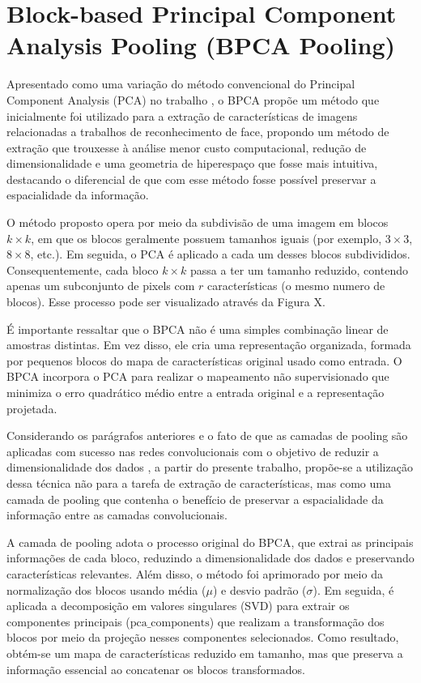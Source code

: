 \section{Block-based Principal Component Analysis Pooling (BPCA Pooling)}
\label{bpca}
Apresentado como uma variação do método convencional do Principal Component Analysis (PCA) no trabalho \cite{Salvadeo2011}, o BPCA propõe um método que inicialmente foi utilizado para a extração de características de imagens relacionadas a trabalhos de reconhecimento de face, propondo um método de extração que trouxesse à análise menor custo computacional, redução de dimensionalidade e uma geometria de hiperespaço que fosse mais intuitiva, destacando o diferencial de que com esse método fosse possível preservar a espacialidade da informação.

O método proposto opera por meio da subdivisão de uma imagem em blocos $k \times k$, em que os blocos geralmente possuem tamanhos iguais (por exemplo, $3 \times 3$, $8 \times 8$, etc.). Em seguida, o PCA é aplicado a cada um desses blocos subdivididos. Consequentemente, cada bloco $k \times k$ passa a ter um tamanho reduzido, contendo apenas um subconjunto de pixels com $r$ características (o mesmo numero de blocos). Esse processo pode ser visualizado através da Figura X.

É importante ressaltar que o BPCA não é uma simples combinação linear de amostras distintas. Em vez disso, ele cria uma representação organizada, formada por pequenos blocos do mapa de características original usado como entrada. O BPCA incorpora o PCA para realizar o mapeamento não supervisionado que minimiza o erro quadrático médio entre a entrada original e a representação projetada.

Considerando os parágrafos anteriores e o fato de que as camadas de pooling são aplicadas com sucesso nas redes convolucionais com o objetivo de reduzir a dimensionalidade dos dados \cite{paul2019dimensionality}, a partir do presente trabalho, propõe-se a utilização dessa técnica não para a tarefa de extração de características, mas como uma camada de pooling que contenha o benefício de preservar a espacialidade da informação entre as camadas convolucionais.

A camada de pooling adota o processo original do BPCA, que extrai as principais informações de cada bloco, reduzindo a dimensionalidade dos dados e preservando características relevantes. Além disso, o método foi aprimorado por meio da normalização dos blocos usando média ($\mu$) e desvio padrão ($\sigma$). Em seguida, é aplicada a decomposição em valores singulares (SVD) para extrair os componentes principais ($\text{{pca\_components}}$) que realizam a transformação dos blocos por meio da projeção nesses componentes selecionados. Como resultado, obtém-se um mapa de características reduzido em tamanho, mas que preserva a informação essencial ao concatenar os blocos transformados.

